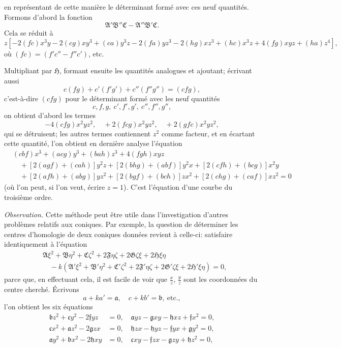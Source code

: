 \documentclass[12pt,a4paper]{article}
\providecommand{\fA}{\mathfrak{A}}
\providecommand{\fB}{\mathfrak{B}}
\providecommand{\fC}{\mathfrak{C}}
\providecommand{\fF}{\mathfrak{F}}
\providecommand{\fG}{\mathfrak{G}}
\providecommand{\fHH}{\mathfrak{H}}
\providecommand{\fla}{\mathfrak{a}}
\providecommand{\flb}{\mathfrak{b}}
\providecommand{\flc}{\mathfrak{c}}
\providecommand{\flf}{\mathfrak{f}}
\providecommand{\flg}{\mathfrak{g}}
\providecommand{\flh}{\mathfrak{h}}
\begin{document}
\newpage
\setcounter{page}{193}

en repr\'esentant de cette mani\`ere le d\'eterminant form\'e avec ces neuf quantit\'es. Formons d'abord la fonction
\[
\fA'\fB''\fC - \fA''\fB'\fC.
\]
Cela se r\'eduit \`a
\[
z[-2(fc)x^3 y - 2(cg)xy^3 + (ca)y^3 z - 2(fa)yz^3 - 2(hg)xz^3 + (hc)x^3 z + 4(fg)xyz + (ha)z^4],
\]
o\`u $(fc) = (f'c'' - f''c')$, etc.

Multipliant par $\fHH$, formant ensuite les quantit\'es analogues et ajoutant; \'ecrivant aussi
\[
c(fg) + c'(f'g') + c''(f''g'') = (cfg),
\]
c'est-\`a-dire $(cfg)$ pour le d\'eterminant form\'e avec les neuf quantit\'es
\[
c, f, g,\ c', f', g',\ c'', f'', g'',
\]
on obtient d'abord les termes
\[
-4(cfg)x^2 yz^2,\quad +2(fcg)x^2 yz^2,\quad +2(gfc)x^2 yz^2,
\]
qui se d\'etruisent; les autres termes contiennent $z^2$ comme facteur, et en \'ecartant cette quantit\'e, l'on obtient en derni\`ere analyse l'\'equation
\begin{align*}
&(cbf)x^3 + (acg)y^3 + (bah)z^3 + 4(fgh)xyz\\
&\quad + [2(agf) + (cah)]y^2 z + [2(bhg) + (abf)]y^2 x + [2(cfh) + (bcg)]x^2 y\\
&\quad + [2(afh) + (abg)]yz^2 + [2(bgf) + (bch)]zx^2 + [2(chg) + (caf)]xz^2 = 0
\end{align*}
(o\`u l'on peut, si l'on veut, \'ecrire $z = 1$). C'est l'\'equation d'une courbe du troisi\`eme ordre.

\medskip
\textit{Observation.} Cette m\'ethode peut \^etre utile dans l'investigation d'autres probl\`emes relatifs aux coniques. Par exemple, la question de d\'eterminer les centres d'homologie de deux coniques donn\'ees revient \`a celle-ci: satisfaire identiquement \`a l'\'equation
\begin{align*}
&\fA\xi^2 + \fB\eta^2 + \fC\zeta^2 + 2\fF\eta\zeta + 2\fG\zeta\xi + 2\fHH\xi\eta\\
&\quad - k(\fA'\xi^2 + \fB'\eta^2 + \fC'\zeta^2 + 2\fF'\eta\zeta + 2\fG'\zeta\xi + 2\fHH'\xi\eta) = 0,
\end{align*}
parce que, en effectuant cela, il est facile de voir que $\tfrac{x}{z}$, $\tfrac{y}{z}$ sont les coordonn\'ees du centre cherch\'e. \'Ecrivons
\[
a + ka' = \fla,\quad c + kb' = \flb,\ \text{etc.},
\]
l'on obtient les six \'equations
\begin{align*}
\flb z^2 + \flc y^2 - 2\flf yz &= 0,\quad \fla yz - \flg xy - \flh xz + \flf x^2 = 0,\\
\flc x^2 + \fla z^2 - 2\flg zx &= 0,\quad \flh zx - \flh yz - \flf yx + \flg y^2 = 0,\\
\fla y^2 + \flb x^2 - 2\flh xy &= 0,\quad \flc xy - \flf zx - \flg zy + \flh z^2 = 0,
\end{align*}
\end{document}
